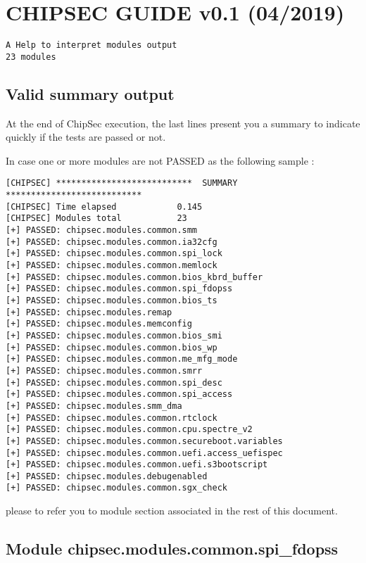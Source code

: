 \hypertarget{chipsec-guide-v0.1-042019}{%
\section{CHIPSEC GUIDE v0.1 (04/2019)}\label{chipsec-guide-v0.1-042019}}

\begin{verbatim}
A Help to interpret modules output
23 modules
\end{verbatim}

\hypertarget{valid-summary-output}{%
\subsection{Valid summary output}\label{valid-summary-output}}

At the end of ChipSec execution, the last lines present you a summary to
indicate quickly if the tests are passed or not.

In case one or more modules are not PASSED as the following sample :

\begin{verbatim}
[CHIPSEC] ***************************  SUMMARY  ***************************
[CHIPSEC] Time elapsed            0.145
[CHIPSEC] Modules total           23
[+] PASSED: chipsec.modules.common.smm
[+] PASSED: chipsec.modules.common.ia32cfg
[+] PASSED: chipsec.modules.common.spi_lock
[+] PASSED: chipsec.modules.common.memlock
[+] PASSED: chipsec.modules.common.bios_kbrd_buffer
[+] PASSED: chipsec.modules.common.spi_fdopss
[+] PASSED: chipsec.modules.common.bios_ts
[+] PASSED: chipsec.modules.remap
[+] PASSED: chipsec.modules.memconfig
[+] PASSED: chipsec.modules.common.bios_smi
[+] PASSED: chipsec.modules.common.bios_wp
[+] PASSED: chipsec.modules.common.me_mfg_mode
[+] PASSED: chipsec.modules.common.smrr
[+] PASSED: chipsec.modules.common.spi_desc
[+] PASSED: chipsec.modules.common.spi_access
[+] PASSED: chipsec.modules.smm_dma
[+] PASSED: chipsec.modules.common.rtclock
[+] PASSED: chipsec.modules.common.cpu.spectre_v2
[+] PASSED: chipsec.modules.common.secureboot.variables
[+] PASSED: chipsec.modules.common.uefi.access_uefispec
[+] PASSED: chipsec.modules.common.uefi.s3bootscript
[+] PASSED: chipsec.modules.debugenabled
[+] PASSED: chipsec.modules.common.sgx_check
\end{verbatim}

please to refer you to module section associated in the rest of this
document.

\hypertarget{module-chipsec.modules.common.spi_fdopss}{%
\subsection{Module
chipsec.modules.common.spi\_fdopss}\label{module-chipsec.modules.common.spi_fdopss}}

